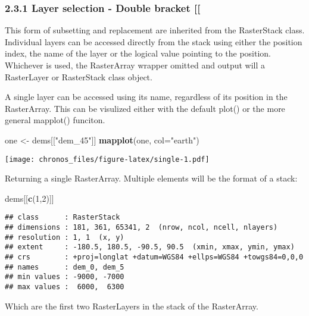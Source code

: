 \documentclass[]{article}
\newenvironment{Shaded}{\begin{snugshade}}{\end{snugshade}}
\newcommand{\DataTypeTok}[1]{\textcolor[rgb]{0.13,0.29,0.53}{#1}}
\newcommand{\DecValTok}[1]{\textcolor[rgb]{0.00,0.00,0.81}{#1}}
\newcommand{\KeywordTok}[1]{\textcolor[rgb]{0.13,0.29,0.53}{\textbf{#1}}}
\newcommand{\NormalTok}[1]{#1}
\newcommand{\StringTok}[1]{\textcolor[rgb]{0.31,0.60,0.02}{#1}}
\begin{document}
\hypertarget{layer-selection---double-bracket}{%
\subsubsection{2.3.1 Layer selection - Double bracket
{[}{[}}\label{layer-selection---double-bracket}}

This form of subsetting and replacement are inherited from the
RasterStack class. Individual layers can be accessed directly from the
stack using either the position index, the name of the layer or the
logical value pointing to the position. Whichever is used, the
RasterArray wrapper omitted and output will a RasterLayer or RasterStack
class object.

A single layer can be accessed using its name, regardless of its
position in the RasterArray. This can be visulized either with the
default plot() or the more general mapplot() funciton.

\begin{Shaded}
\begin{Highlighting}[]
\NormalTok{one <-}\StringTok{ }\NormalTok{dems[[}\StringTok{"dem_45"}\NormalTok{]]}
\KeywordTok{mapplot}\NormalTok{(one, }\DataTypeTok{col=}\StringTok{"earth"}\NormalTok{)}
\end{Highlighting}
\end{Shaded}

\texttt{[image: chronos\_files/figure-latex/single-1.pdf]}

Returning a single RasterArray. Multiple elements will be the format of
a stack:

\begin{Shaded}
\begin{Highlighting}[]
\NormalTok{dems[[}\KeywordTok{c}\NormalTok{(}\DecValTok{1}\NormalTok{,}\DecValTok{2}\NormalTok{)]]}
\end{Highlighting}
\end{Shaded}

\begin{verbatim}
## class      : RasterStack 
## dimensions : 181, 361, 65341, 2  (nrow, ncol, ncell, nlayers)
## resolution : 1, 1  (x, y)
## extent     : -180.5, 180.5, -90.5, 90.5  (xmin, xmax, ymin, ymax)
## crs        : +proj=longlat +datum=WGS84 +ellps=WGS84 +towgs84=0,0,0 
## names      : dem_0, dem_5 
## min values : -9000, -7000 
## max values :  6000,  6300
\end{verbatim}

Which are the first two RasterLayers in the stack of the RasterArray.
\end{document}
